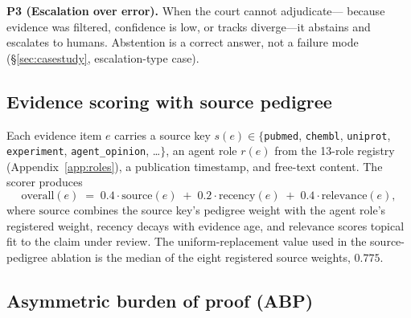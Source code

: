 \documentclass[11pt]{article}
\begin{document}
\textbf{P3 (Escalation over error).} When the court cannot adjudicate—
because evidence was filtered, confidence is low, or tracks diverge—it
abstains and escalates to humans. Abstention is a correct answer, not a
failure mode (\S\ref{sec:casestudy}, escalation-type case).

\subsection{Evidence scoring with source pedigree}\label{sec:scorer}

Each evidence item $e$ carries a source key $s(e)\in\{$\texttt{pubmed},
\texttt{chembl}, \texttt{uniprot}, \texttt{experiment},\linebreak
\texttt{agent\_opinion},
\dots$\}$, an agent role $r(e)$ from the 13-role registry
(Appendix~\ref{app:roles}), a publication timestamp, and free-text content.
The scorer produces
\begin{equation}\label{eq:overall}
\mathrm{overall}(e) \;=\; 0.4\cdot \mathrm{source}(e)
                      \;+\; 0.2\cdot \mathrm{recency}(e)
                      \;+\; 0.4\cdot \mathrm{relevance}(e),
\end{equation}
where $\mathrm{source}$ combines the source key's pedigree weight with the
agent role's registered weight, $\mathrm{recency}$ decays with evidence age,
and $\mathrm{relevance}$ scores topical fit to the claim under review. The
uniform-replacement value used in the source-pedigree ablation is the median
of the eight registered source weights, $0.775$.

\subsection{Asymmetric burden of proof (ABP)}\label{sec:abp}
\end{document}

